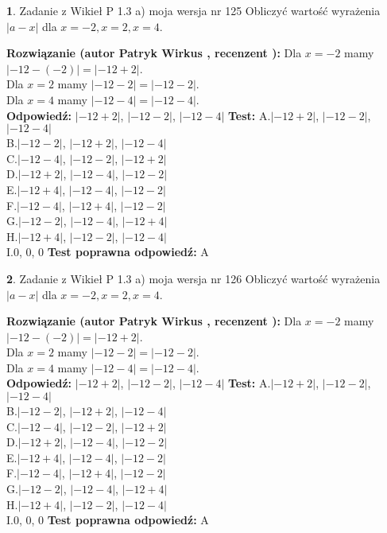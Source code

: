 \documentclass[12pt, a4paper]{article}
\theoremstyle{definition} %
\newtheorem{zad}{}
\newcommand{\zadStart}[1]{\begin{zad}#1\newline}
\newcommand{\zadStop}{\end{zad}}
\newcommand{\rozwStart}[2]{\noindent \textbf{Rozwiązanie (autor #1 , recenzent #2): }\newline}
\newcommand{\rozwStop}{\newline}
\newcommand{\odpStart}{\noindent \textbf{Odpowiedź:}\newline}
\newcommand{\odpStop}{\newline}
\newcommand{\testStart}{\noindent \textbf{Test:}\newline}
\newcommand{\testStop}{\newline}
\newcommand{\kluczStart}{\noindent \textbf{Test poprawna odpowiedź:}\newline}
\newcommand{\kluczStop}{\newline}
\begin{document}
\zadStart{Zadanie z Wikieł P 1.3 a) moja wersja nr 125}
Obliczyć wartość wyrażenia $|a - x|$ dla $x=-2,x=2,x=4$.
\zadStop
\rozwStart{Patryk Wirkus}{}
Dla $x = -2$ mamy $|-12 - (-2)| = |-12 + 2|$.\\
Dla $x = 2$ mamy $|-12 - 2| = |-12 - 2|$.\\
Dla $x = 4$ mamy $|-12 - 4| = |-12 - 4|$.\\
\rozwStop
\odpStart
$|-12 + 2|$, $|-12 - 2|$, $|-12 - 4|$
\odpStop
\testStart
A.$|-12 + 2|$, $|-12 - 2|$, $|-12 - 4|$\\
B.$|-12 - 2|$, $|-12 + 2|$, $|-12 - 4|$\\
C.$|-12 - 4|$, $|-12 - 2|$, $|-12 + 2|$\\
D.$|-12 + 2|$, $|-12 - 4|$, $|-12 - 2|$\\
E.$|-12 + 4|$, $|-12 - 4|$, $|-12 - 2|$\\
F.$|-12 - 4|$, $|-12 + 4|$, $|-12 - 2|$\\
G.$|-12 - 2|$, $|-12 - 4|$, $|-12 + 4|$\\
H.$|-12 + 4|$, $|-12 - 2|$, $|-12 - 4|$\\
I.$0$, $0$, $0$
\testStop
\kluczStart
A
\kluczStop



\zadStart{Zadanie z Wikieł P 1.3 a) moja wersja nr 126}
Obliczyć wartość wyrażenia $|a - x|$ dla $x=-2,x=2,x=4$.
\zadStop
\rozwStart{Patryk Wirkus}{}
Dla $x = -2$ mamy $|-12 - (-2)| = |-12 + 2|$.\\
Dla $x = 2$ mamy $|-12 - 2| = |-12 - 2|$.\\
Dla $x = 4$ mamy $|-12 - 4| = |-12 - 4|$.\\
\rozwStop
\odpStart
$|-12 + 2|$, $|-12 - 2|$, $|-12 - 4|$
\odpStop
\testStart
A.$|-12 + 2|$, $|-12 - 2|$, $|-12 - 4|$\\
B.$|-12 - 2|$, $|-12 + 2|$, $|-12 - 4|$\\
C.$|-12 - 4|$, $|-12 - 2|$, $|-12 + 2|$\\
D.$|-12 + 2|$, $|-12 - 4|$, $|-12 - 2|$\\
E.$|-12 + 4|$, $|-12 - 4|$, $|-12 - 2|$\\
F.$|-12 - 4|$, $|-12 + 4|$, $|-12 - 2|$\\
G.$|-12 - 2|$, $|-12 - 4|$, $|-12 + 4|$\\
H.$|-12 + 4|$, $|-12 - 2|$, $|-12 - 4|$\\
I.$0$, $0$, $0$
\testStop
\kluczStart
A
\kluczStop
\end{document}

